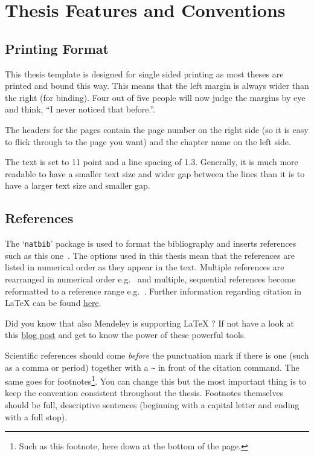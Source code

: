 \section{Thesis Features and Conventions}
\label{ThesisConventions}

\subsection{Printing Format}

This thesis template is designed for single sided printing as most theses are printed and bound this way. This means that the left margin is always wider than the right (for binding). Four out of five people will now judge the margins by eye and think, ``I never 
noticed that before.''.

The headers for the pages contain the page number on the right side (so it is easy to flick through to the page you want) and the chapter name on the left side.

The text is set to 11 point and a line spacing of 1.3. Generally, it is much more readable to have a smaller text size and wider gap between the lines than it is to have a larger text size and smaller gap.

\subsection{References}

The `\texttt{natbib}' package is used to format the bibliography and inserts references such as this one~\citep{Reference3}. The options used in this thesis mean that the references are listed in numerical order as they appear in the text. Multiple references are rearranged in numerical order e.g.~\citep{Reference2, Reference1} and multiple, sequential references become reformatted to a reference range e.g.~\citep{Reference2, Reference1, Reference3}. Further information regarding citation in LaTeX{} can be found \href{http://en.wikibooks.org/wiki/LaTeX/Bibliography_Management}{here}.

Did you know that also Mendeley is supporting \LaTeX{} ? If not have a look at this \href{http://blog.mendeley.com/tipstricks/howto-use-mendeley-to-create-citations-using-latex-and-bibtex/}{blog post} and get to know the power of these powerful tools. 

Scientific references should come \emph{before} the punctuation mark if there is one (such as a comma or period) together with a \verb!~! in front of the citation command. The same goes for footnotes\footnote{Such as this footnote, here down at the bottom of the page.}. You can change this but the most important thing is to keep the convention consistent throughout the thesis. Footnotes themselves should be full, descriptive sentences (beginning with a capital letter and ending with a full stop).

